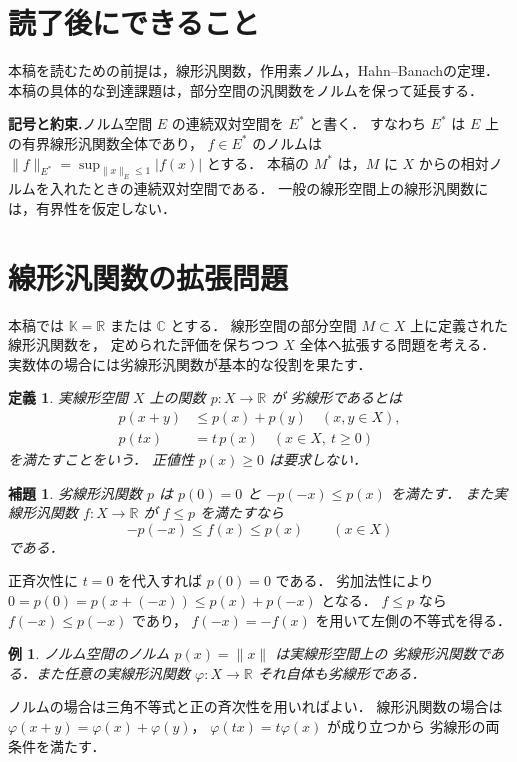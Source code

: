 \documentclass[a5paper,10pt,onecolumn]{jsarticle}
\makeatletter
\theoremstyle{mathnotetheorem}
\newtheorem{definition}[theorem]{定義}
\newtheorem{lemma}[theorem]{補題}
\newtheorem{example}[theorem]{例}
\renewcommand{\proofname}{証明}
\renewenvironment{proof}[1][\proofname]{%
  \par\pushQED{\qed}\normalfont\topsep4\p@\@plus2\p@\relax
  \trivlist\item[\hskip\labelsep\bfseries #1]\ignorespaces
}{\popQED\endtrivlist\@endpefalse}
\makeatother
\begin{document}
\section*{読了後にできること}
本稿を読むための前提は，線形汎関数，作用素ノルム，Hahn--Banachの定理．
本稿の具体的な到達課題は，部分空間の汎関数をノルムを保って延長する．

\noindent\textbf{記号と約束.}\quad ノルム空間 $E$ の連続双対空間を $E^*$ と書く．
すなわち $E^*$ は $E$ 上の有界線形汎関数全体であり，
$f\in E^*$ のノルムは
$\|f\|_{E^*}=\sup_{\|x\|_E\le1}|f(x)|$ とする．
本稿の $M^*$ は，$M$ に $X$ からの相対ノルムを入れたときの連続双対空間である．
一般の線形空間上の線形汎関数には，有界性を仮定しない．

\section{線形汎関数の拡張問題}

本稿では $\mathbb K=\mathbb R$ または $\mathbb C$ とする．
線形空間の部分空間 $M\subset X$ 上に定義された線形汎関数を，
定められた評価を保ちつつ $X$ 全体へ拡張する問題を考える．
実数体の場合には劣線形汎関数が基本的な役割を果たす．

\begin{definition}
実線形空間 $X$ 上の関数 $p:X\to\mathbb R$ が
\emph{劣線形}であるとは
\begin{align*}
 p(x+y)&\le p(x)+p(y)\quad(x,y\in X),\\
 p(tx)&=t\,p(x)\quad(x\in X,\ t\ge0)
\end{align*}
を満たすことをいう．
正値性 $p(x)\ge0$ は要求しない．
\end{definition}

\begin{lemma}\label{lem:sublinear}
劣線形汎関数 $p$ は $p(0)=0$ と
$-p(-x)\le p(x)$ を満たす．
また実線形汎関数 $f:X\to\mathbb R$ が
$f\le p$ を満たすなら
\[
 -p(-x)\le f(x)\le p(x)\qquad(x\in X)
\]
である．
\end{lemma}
\begin{proof}
正斉次性に $t=0$ を代入すれば $p(0)=0$ である．
劣加法性により
$0=p(0)=p(x+(-x))\le p(x)+p(-x)$ となる．
$f\le p$ なら $f(-x)\le p(-x)$ であり，
$f(-x)=-f(x)$ を用いて左側の不等式を得る．
\end{proof}

\begin{example}
ノルム空間のノルム $p(x)=\|x\|$ は実線形空間上の
劣線形汎関数である．また任意の実線形汎関数
$\varphi:X\to\mathbb R$ それ自体も劣線形である．
\end{example}
\begin{proof}
ノルムの場合は三角不等式と正の斉次性を用いればよい．
線形汎関数の場合は
$\varphi(x+y)=\varphi(x)+\varphi(y)$，
$\varphi(tx)=t\varphi(x)$ が成り立つから
劣線形の両条件を満たす．
\end{proof}
\end{document}

